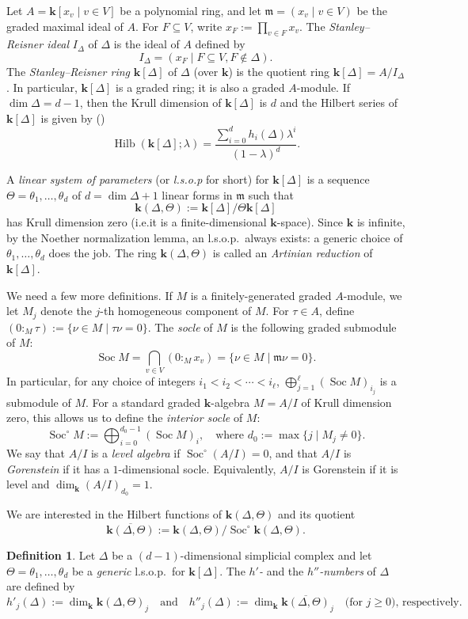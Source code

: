 \documentclass[10pt]{amsart}
\theoremstyle{definition}
\newtheorem{defi}[theorem]{Definition}
\providecommand{\ie}{i.e.}
\DeclareMathOperator{\Hilb}{Hilb}
\DeclareMathOperator{\Soc}{Soc}
\newcommand{\field}{\mathbf{k}}
\newcommand{\mideal}{\ensuremath{\mathfrak{m}}}
\begin{document}
Let $A=\field[x_v \mid v\in V]$ be a polynomial ring, and let $\mideal=(x_v \mid v\in V)$ be the graded maximal ideal of $A$. For $F\subseteq V$, write $x_F:=\prod_{v\in F} x_v$. The \emph{Stanley--Reisner ideal} $I_\Delta$ of $\Delta$ is the ideal of $A$ defined by 
\[
I_\Delta=(x_F \mid F\subseteq V, F\notin\Delta).\]
The \emph{Stanley--Reisner ring} $\field[\Delta]$ of $\Delta$ (over $\field$) is the quotient ring $\field[\Delta]=A/I_\Delta$. In particular, $\field[\Delta]$ is a graded ring; it is also a graded $A$-module. If $\dim\Delta=d-1$, then the Krull dimension of $\field[\Delta]$ is $d$ and the Hilbert series of $\field[\Delta]$ is given by (\cite[Chapter~II.1]{Stanley-96})
\[
\Hilb(\field[\Delta]; \lambda)=\frac{\sum_{i=0}^d h_i(\Delta)\lambda^i}{(1-\lambda)^d}.\]

A \emph{linear system of parameters} (or \emph{l.s.o.p} for short) for $\field[\Delta]$ is a sequence $\Theta=\theta_1,\ldots,\theta_d$ of $d=\dim\Delta + 1$ linear forms in $\mideal$ such that \[\field(\Delta,\Theta):= \field[\Delta]/\Theta\field[\Delta]\]
has Krull dimension zero (\ie it is a finite-dimensional $\field$-space). Since $\field$ is infinite, by the Noether normalization lemma, an l.s.o.p.~always exists: a generic choice of $\theta_1,\ldots,\theta_d$ does the job.
The ring $\field(\Delta,\Theta)$ is called an \emph{Artinian reduction} of $\field[\Delta]$. 

We need a few more definitions. If $M$ is a finitely-generated graded $A$-module, we let $M_j$ denote the $j$-th homogeneous component of $M$. For $\tau\in A$, define $(0:_M \tau):=\{\nu\in M \mid \tau\nu=0\}$. The \emph{socle} of $M$ is the following graded submodule of $M$:
\[\Soc M=\bigcap_{v\in V}(0:_M x_v)=\{\nu\in M \mid \mideal\nu=0\}.\]
In particular, for any choice of integers $i_1<i_2<\cdots<i_\ell$, $\bigoplus_{j=1}^\ell (\Soc M)_{i_j}$ is a submodule of $M$.
For a standard graded $\field$-algebra $M=A/I$ of Krull dimension zero, this allows us to define the \emph{interior socle} of $M$: 
\[
\Soc^\circ M:=\bigoplus_{i=0}^{d_0-1}(\Soc M)_i, \quad \mbox{where $d_0:=\max\{j \mid M_j\neq 0\}$}.
\]
We say that $A/I$ is a \emph{level algebra} if $\Soc^\circ(A/I)=0$, and that $A/I$ is \emph{Gorenstein} if it has a $1$-dimensional socle. Equivalently, $A/I$ is Gorenstein if it is level and $\dim_\field (A/I)_{d_0}=1$.


We are interested in the Hilbert functions of $\field(\Delta,\Theta)$ and its quotient \[\overline{\field(\Delta,\Theta)}:= \field(\Delta,\Theta)/\Soc^\circ \field(\Delta,\Theta).\] 
\begin{defi} \label{def-h'-h''}
Let $\Delta$ be a $(d-1)$-dimensional simplicial complex and let $\Theta=\theta_1,\ldots,\theta_d$ be a \emph{generic} l.s.o.p.~for $\field[\Delta]$. The \emph{$h'$-} and the \emph{$h''$-numbers} of $\Delta$ are defined by
\[
h'_j(\Delta):=\dim_\field \field(\Delta,\Theta)_j \quad \mbox{and} \quad h''_j(\Delta):=\dim_\field \overline{\field(\Delta,\Theta)}_j \quad \mbox{(for $j\geq 0$), respectively.}
\]
\end{defi} 
\end{document}
